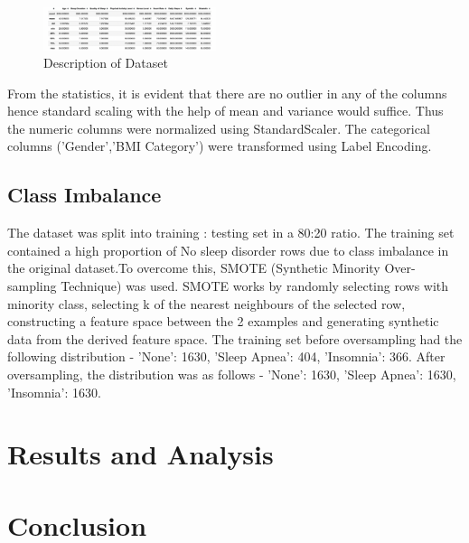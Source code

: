 \documentclass[10pt,twocolumn,letterpaper]{article}
\begin{document}
\begin{figure}[H]
    
    \includegraphics[width=0.45\textwidth]{Description.png} %
    \caption{Description of Dataset}
\end{figure} 
From the statistics, it is evident that there are no outlier in any of the columns hence standard scaling with the help of mean and variance would suffice. Thus the numeric columns were normalized using StandardScaler. The categorical columns ('Gender','BMI Category') were transformed using Label Encoding. 
\subsection{Class Imbalance}
The dataset was split into training : testing set in a 80:20 ratio. The training set contained a high proportion of No sleep disorder rows due to class imbalance in the original dataset.To overcome this, SMOTE (Synthetic Minority Over-sampling Technique) was used. SMOTE works by randomly selecting rows with minority class, selecting k of the nearest neighbours of the selected row, constructing a feature space between the 2 examples and generating synthetic data from the derived feature space. The training set before oversampling had the following distribution - 'None': 1630, 'Sleep Apnea': 404, 'Insomnia': 366. After oversampling, the distribution was as follows - 'None': 1630, 'Sleep Apnea': 1630, 'Insomnia': 1630.
\section{Results and Analysis}
\section{Conclusion}



\end{document}
